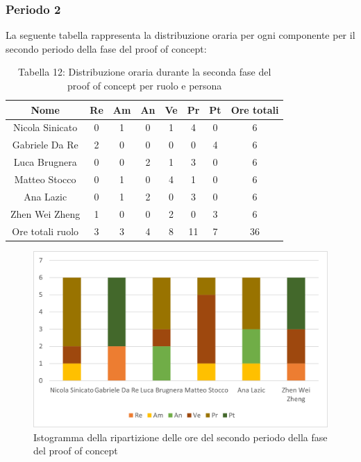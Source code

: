 \subsubsection{Periodo 2}
%
La seguente tabella rappresenta la distribuzione oraria per ogni componente per il secondo periodo della fase del proof of concept:
\begin{table}[h]
	\setlength\extrarowheight{5pt}
	\centering
	\begin{tabularx}{\textwidth}{|ccccccc|c|}
		\hline
		\rowcolor{white}
		\textbf{Nome} & \textbf{Re} & \textbf{Am} & \textbf{An} & \textbf{Ve} & \textbf{Pr}& \textbf{Pt} & \textbf{Ore totali} \\
		\hline
		Nicola Sinicato &0&1&0&1&4&0&6 \\
		Gabriele Da Re &2&0&0&0&0&4&6 \\
		Luca Brugnera &0&0&2&1&3&0&6 \\
		Matteo Stocco &0&1&0&4&1&0&6 \\
		Ana Lazic &0&1&2&0&3&0&6 \\
		Zhen Wei Zheng &1&0&0&2&0&3&6 \\
		\hline
		Ore totali ruolo &3&3&4&8&11&7&36 \\
		\hline
	\end{tabularx}
	\vspace{10pt}
	\caption{Tabella 12: Distribuzione oraria durante la seconda fase del proof of concept per ruolo e persona}
\end{table}
\begin{figure}[H]
    \centering
    \includegraphics[scale=0.6]{img/grafi preventivo/istogrammi/proof/periodo2.png}
    \caption{Istogramma della ripartizione delle ore del secondo periodo della fase del proof of concept}
\end{figure}
